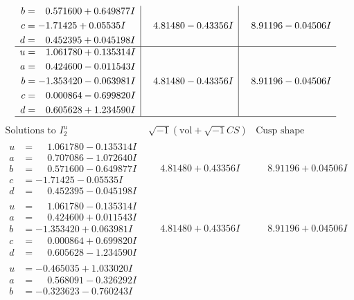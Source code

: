 \documentclass[1p]{elsarticle_modified}
\theoremstyle{definition}
\newcommand{\I}{\sqrt{-1}}
\begin{document}
$$\begin{array}{c|c|c}
\begin{aligned}
b &= \phantom{-}0.571600 + 0.649877 I \\
c &= -1.71425 + 0.05535 I \\
d &= \phantom{-}0.452395 + 0.045198 I\end{aligned}
 & \phantom{-}4.81480 - 0.43356 I & \phantom{-}8.91196 - 0.04506 I \\ \hline\begin{aligned}
u &= \phantom{-}1.061780 + 0.135314 I \\
a &= \phantom{-}0.424600 - 0.011543 I \\
b &= -1.353420 - 0.063981 I \\
c &= \phantom{-}0.000864 - 0.699820 I \\
d &= \phantom{-}0.605628 + 1.234590 I\end{aligned}
 & \phantom{-}4.81480 - 0.43356 I & \phantom{-}8.91196 - 0.04506 I\\
 \hline 
 \end{array}$$\newpage$$\begin{array}{c|c|c}  
\text{Solutions to }I^u_{2}& \I (\text{vol} + \sqrt{-1}CS) & \text{Cusp shape}\\
 \hline 
\begin{aligned}
u &= \phantom{-}1.061780 - 0.135314 I \\
a &= \phantom{-}0.707086 - 1.072640 I \\
b &= \phantom{-}0.571600 - 0.649877 I \\
c &= -1.71425 - 0.05535 I \\
d &= \phantom{-}0.452395 - 0.045198 I\end{aligned}
 & \phantom{-}4.81480 + 0.43356 I & \phantom{-}8.91196 + 0.04506 I \\ \hline\begin{aligned}
u &= \phantom{-}1.061780 - 0.135314 I \\
a &= \phantom{-}0.424600 + 0.011543 I \\
b &= -1.353420 + 0.063981 I \\
c &= \phantom{-}0.000864 + 0.699820 I \\
d &= \phantom{-}0.605628 - 1.234590 I\end{aligned}
 & \phantom{-}4.81480 + 0.43356 I & \phantom{-}8.91196 + 0.04506 I \\ \hline\begin{aligned}
u &= -0.465035 + 1.033020 I \\
a &= \phantom{-}0.568091 - 0.326292 I \\
b &= -0.323623 - 0.760243 I \\

\end{aligned}
\end{array}$$
\end{document}
